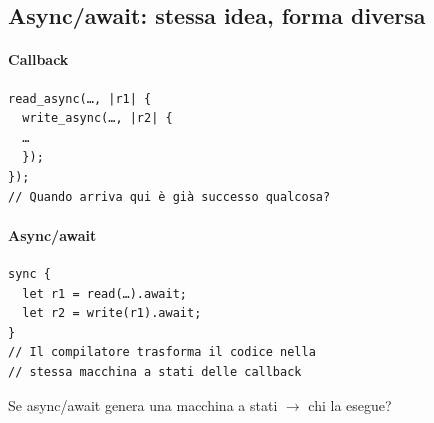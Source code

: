 \subsection{Async/await: stessa idea, forma diversa}


\begin{flushleft}
  \begin{minipage}[t]{0.45\linewidth}

    \paragraph{Callback}


    \raggedright
    \begin{verbatim}
read_async(…, |r1| {
  write_async(…, |r2| {
  …
  });
});
// Quando arriva qui è già successo qualcosa?
\end{verbatim}
  \end{minipage}%
  \hfill
  \begin{minipage}[t]{0.45\linewidth}

    \paragraph{Async/await}


    \raggedright
    \begin{verbatim}
sync {
  let r1 = read(…).await;
  let r2 = write(r1).await;
}
// Il compilatore trasforma il codice nella 
// stessa macchina a stati delle callback
\end{verbatim}
  \end{minipage}
\end{flushleft}

Se async/await genera una macchina a stati $\to$ chi la esegue?





